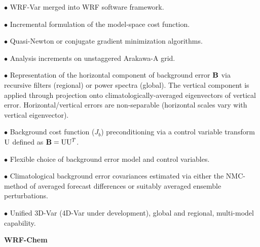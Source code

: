 \begin{description}
\setlength{\itemsep}{-5pt}
\item{$\bullet$} WRF-Var merged into WRF software framework.
%
\item{$\bullet$} Incremental formulation of the model-space cost function.
%
\item{$\bullet$} Quasi-Newton or conjugate gradient minimization algorithms.
%
\item{$\bullet$} Analysis increments on unstaggered Arakawa-A grid.
%
\item{$\bullet$} Representation of the horizontal component of background error ${\bf B}$ via
recursive filters (regional) or power spectra (global). The
vertical component is applied through projection onto climatologically-averaged 
eigenvectors of vertical error. Horizontal/vertical errors are
non-separable (horizontal scales vary with vertical eigenvector).
%
\item{$\bullet$}  Background cost function ($J_b$) preconditioning 
via a control variable transform ${\rm U}$ defined as ${\bf B}={\rm U} {\rm U}^T$.
%
\item{$\bullet$} Flexible choice of background error model and control variables.
%
\item{$\bullet$} Climatological background error covariances estimated via either the
NMC-method of averaged forecast differences or suitably averaged
ensemble perturbations.
%
\item{$\bullet$} Unified 3D-Var (4D-Var under development), global 
and regional, multi-model capability.
%
\end{description}

\vskip 12pt
{\noindent\bf WRF-Chem}
\vskip 12pt

